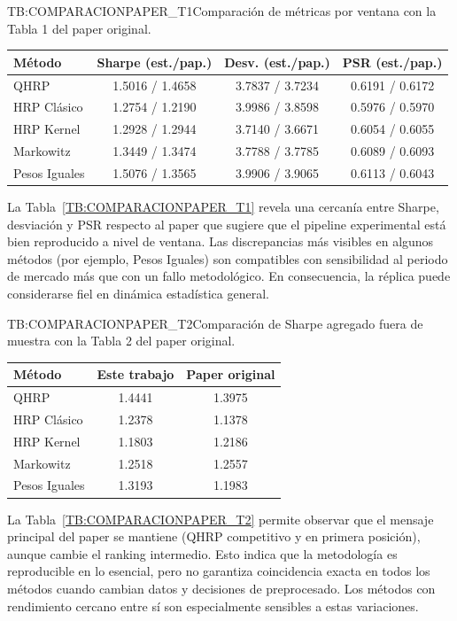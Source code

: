 \begin{table}[Comparación con paper original (Tabla 1)]{TB:COMPARACIONPAPER_T1}{Comparación de métricas por ventana con la Tabla 1 del paper original.}
\begin{tabular}{lccc}
\hline
\textbf{Método} & \textbf{Sharpe (est./pap.)} & \textbf{Desv. (est./pap.)} & \textbf{PSR (est./pap.)} \\
\hline
QHRP & 1.5016 / 1.4658 & 3.7837 / 3.7234 & 0.6191 / 0.6172 \\
HRP Clásico & 1.2754 / 1.2190 & 3.9986 / 3.8598 & 0.5976 / 0.5970 \\
HRP Kernel & 1.2928 / 1.2944 & 3.7140 / 3.6671 & 0.6054 / 0.6055 \\
Markowitz & 1.3449 / 1.3474 & 3.7788 / 3.7785 & 0.6089 / 0.6093 \\
Pesos Iguales & 1.5076 / 1.3565 & 3.9906 / 3.9065 & 0.6113 / 0.6043 \\
\hline
\end{tabular}
\end{table}

La Tabla~\ref{TB:COMPARACIONPAPER_T1} revela una cercanía entre Sharpe, desviación y PSR respecto al paper que sugiere que el pipeline experimental está bien reproducido a nivel de ventana. Las discrepancias más visibles en algunos métodos (por ejemplo, Pesos Iguales) son compatibles con sensibilidad al periodo de mercado más que con un fallo metodológico. En consecuencia, la réplica puede considerarse fiel en dinámica estadística general.

\begin{table}[Comparación con paper original (Tabla 2)]{TB:COMPARACIONPAPER_T2}{Comparación de Sharpe agregado fuera de muestra con la Tabla 2 del paper original.}
\begin{tabular}{lcc}
\hline
\textbf{Método} & \textbf{Este trabajo} & \textbf{Paper original} \\
\hline
QHRP & 1.4441 & 1.3975 \\
HRP Clásico & 1.2378 & 1.1378 \\
HRP Kernel & 1.1803 & 1.2186 \\
Markowitz & 1.2518 & 1.2557 \\
Pesos Iguales & 1.3193 & 1.1983 \\
\hline
\end{tabular}
\end{table}

La Tabla~\ref{TB:COMPARACIONPAPER_T2} permite observar que el mensaje principal del paper se mantiene (QHRP competitivo y en primera posición), aunque cambie el ranking intermedio. Esto indica que la metodología es reproducible en lo esencial, pero no garantiza coincidencia exacta en todos los métodos cuando cambian datos y decisiones de preprocesado. Los métodos con rendimiento cercano entre sí son especialmente sensibles a estas variaciones.

